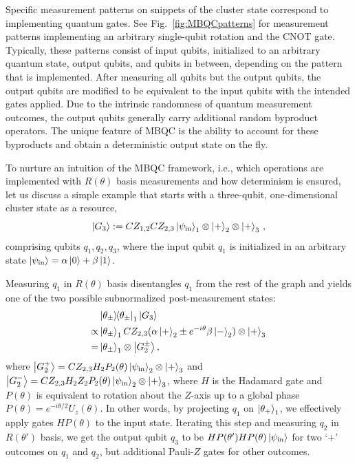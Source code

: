 \documentclass[../main.tex]{subfiles}
\begin{document}
Specific measurement patterns on snippets of the cluster state correspond to implementing quantum gates. See Fig.~\ref{fig:MBQCpatterns} for measurement patterns implementing an arbitrary single-qubit rotation and the CNOT gate. Typically, these patterns consist of input qubits, initialized to an arbitrary quantum state, output qubits, and qubits in between, depending on the pattern that is implemented. After measuring all qubits but the output qubits, the output qubits are modified to be equivalent to the input qubits with the intended gates applied. Due to the intrinsic randomness of quantum measurement outcomes, the output qubits generally carry additional random byproduct operators. The unique feature of MBQC is the ability to account for these byproducts and obtain a deterministic output state on the fly.

To nurture an intuition of the MBQC framework, i.e., which operations are implemented with $R(\theta)$ basis measurements and how determinism is ensured, let us discuss a simple example that starts with a three-qubit, one-dimensional cluster state as a resource,
\begin{equation}
    \ket{G_3}: = CZ_{1,2}CZ_{2,3} \ket{\psi_\mathrm{in}}_1
    \otimes \ket{+}_2 \otimes \ket{+}_3\,,
\end{equation}
comprising qubits $q_1,q_2,q_3$, where the input qubit $q_1$ is initialized in an arbitrary state $\ket{\psi_\mathrm{in}} = \alpha \ket{0} + \beta \ket{1}$. 

Measuring $q_1$ in $R(\theta)$ basis  disentangles $q_1$ from the rest of the graph and yields one of the two possible subnormalized post-measurement states: 
\begin{align}
   & \ketbra{\theta_\pm}_1 \ket{G_3}\\
   \propto & \ket{\theta_{\pm}}_1 CZ_{2,3} (\alpha \ket{+}_2 \pm e^{-i\theta}\beta \ket{-}_2) \otimes \ket{+}_3\\
    = &\ket{\theta_{\pm}}_1 \otimes 
    \ket{G_2^{\pm}},
\end{align}
where $ \ket{G_2^{+}}=CZ_{2,3} H_2 P_2(\theta) \ket{\psi_\mathrm{in}}_2 \otimes \ket{+}_3$  and $\ket{G_2^{-}}=CZ_{2,3} H_2 Z_2 P_2(\theta) \ket{\psi_\mathrm{in}}_2 \otimes \ket{+}_3$, where $H$ is the Hadamard gate and 
$P(\theta)$ is equivalent to rotation about the $Z$-axis up to a global phase $P(\theta) = e^{-i \theta/2}U_z(\theta)$. In other words, by projecting $q_1$ on $\ket{\theta_+}_1$, we effectively apply gates $H P(\theta)$ to the input state. Iterating this step and measuring $q_2$ in $R(\theta')$ basis, we  get the output qubit $q_3$ to be $HP(\theta')HP(\theta)\ket{\psi_\mathrm{in}}$ for two `$+$' outcomes on $q_1$ and $q_2$, but additional Pauli-$Z$ gates for other outcomes.
\end{document}
